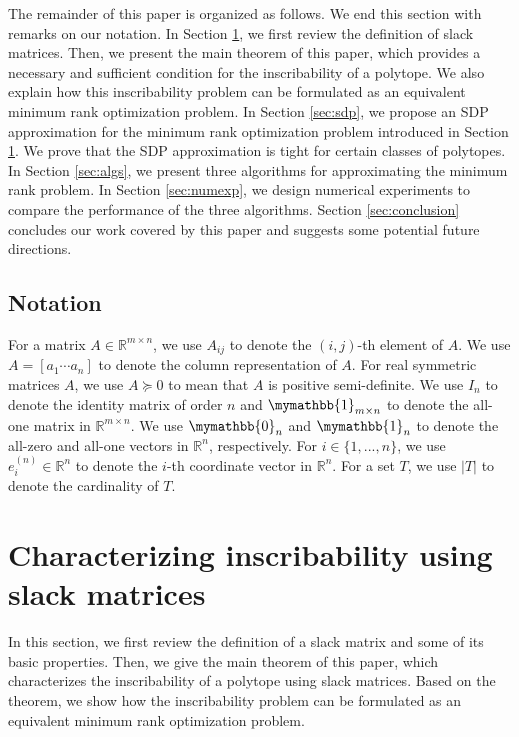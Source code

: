 \documentclass[smallextended, envcountsame]{svjour3}
\begin{document}
    The remainder of this paper is organized as follows.  We end this section with remarks on our notation.  In Section \ref{sec:characterize}, we first review the definition of slack matrices.  Then, we present the main theorem of this paper, which provides a necessary and sufficient condition for the inscribability of a polytope.  We also explain how this inscribability problem can be formulated as an equivalent minimum rank optimization problem.  In Section \ref{sec:sdp}, we propose an SDP approximation for the minimum rank optimization problem introduced in Section \ref{sec:characterize}.  We prove that the SDP approximation is tight for certain classes of polytopes.  In Section \ref{sec:algs}, we present three algorithms for approximating the minimum rank problem.  In Section \ref{sec:numexp}, we design numerical experiments to compare the performance of the three algorithms.  Section \ref{sec:conclusion} concludes our work covered by this paper and suggests some potential future directions.


\subsection{Notation}
    For a matrix $A\in\mathbb{R}^{m\times n}$, we use $A_{ij}$ to denote the $(i,j)$-th element of $A$.  We use $A=[a_1\cdots a_n]$ to denote the column representation of $A$.  For real symmetric matrices $A$, we use $A\succeq 0$ to mean that $A$ is positive semi-definite.  We use $I_n$ to denote the identity matrix of order $n$ and $\mymathbb{1}_{m\times n}$ to denote the all-one matrix in $\mathbb{R}^{m\times n}$.  We use $\mymathbb{0}_n$ and $\mymathbb{1}_n$ to denote the all-zero and all-one vectors in $\mathbb{R}^{n}$, respectively.  For $i\in\{1,...,n\}$, we use $e_i^{(n)}\in\mathbb{R}^n$ to denote the $i$-th coordinate vector in $\mathbb{R}^n$. For a set $T$, we use $|T|$ to denote the cardinality of $T$.  


\section{Characterizing inscribability using slack matrices}\label{sec:characterize}
    In this section, we first review the definition of a slack matrix and some of its basic properties.  Then, we give the main theorem of this paper, which characterizes the inscribability of a polytope using slack matrices.  Based on the theorem, we show how the inscribability problem can be formulated as an equivalent minimum rank optimization problem.
    
\end{document}
